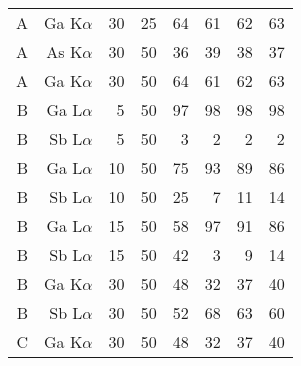 \begin{table}[phtb]
\begin{center}
\begin{tabular}{rrrrrrrr}
            A               & Ga K$\alpha$  & 30             & 25             & 64                        & 61                     & 62                     & 63                     \\
            A               & As K$\alpha$  & 30             & 50             & 36                        & 39                     & 38                     & 37                     \\
            A               & Ga K$\alpha$  & 30             & 50             & 64                        & 61                     & 62                     & 63                     \\
            \hline
            B               & Ga L$\alpha$  & 5              & 50             & 97                        & 98                     & 98                     & 98                     \\
            B               & Sb L$\alpha$  & 5              & 50             & 3                         & 2                      & 2                      & 2                      \\
            B               & Ga L$\alpha$  & 10             & 50             & 75                        & 93                     & 89                     & 86                     \\
            B               & Sb L$\alpha$  & 10             & 50             & 25                        & 7                      & 11                     & 14                     \\
            B               & Ga L$\alpha$  & 15             & 50             & 58                        & 97                     & 91                     & 86                     \\
            B               & Sb L$\alpha$  & 15             & 50             & 42                        & 3                      & 9                      & 14                     \\
            B               & Ga K$\alpha$  & 30             & 50             & 48                        & 32                     & 37                     & 40                     \\
            B               & Sb L$\alpha$  & 30             & 50             & 52                        & 68                     & 63                     & 60                     \\
            \hline
            C               & Ga K$\alpha$  & 30             & 50             & 48                        & 32                     & 37                     & 40                     \\

\end{tabular}
\end{center}
\end{table}
